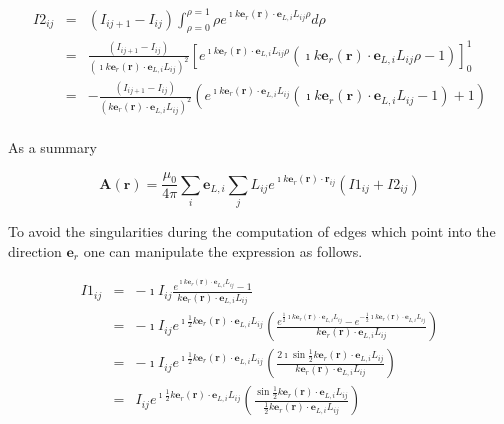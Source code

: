 \documentclass[a4paper,10pt]{report}
\begin{document}
\begin{eqnarray}\label{I2_solution}
    I2_{ij}&=&\left(I_{ij+1}-I_{ij}\right)\int_{\rho=0}^{\rho=1} \rho e^{\imath k \mathbf{e}_r(\mathbf{r}) \cdot\mathbf{e}_{L,i}L_{ij}\rho} d\rho \\
&=&\frac{\left(I_{ij+1}-I_{ij}\right)}{\left( \imath k \mathbf{e}_r(\mathbf{r}) \cdot\mathbf{e}_{L,i}L_{ij}\right)^2 } \left[ e^{\imath k \mathbf{e}_r(\mathbf{r}) \cdot\mathbf{e}_{L,i}L_{ij}\rho} \left(\imath k \mathbf{e}_r(\mathbf{r}) \cdot\mathbf{e}_{L,i}L_{ij}\rho -1 \right)\right]_0^1 \nonumber \\
&=&-\frac{\left(I_{ij+1}-I_{ij}\right)}{\left( k \mathbf{e}_r(\mathbf{r}) \cdot\mathbf{e}_{L,i}L_{ij}\right)^2 } \left( e^{\imath k \mathbf{e}_r(\mathbf{r}) \cdot\mathbf{e}_{L,i}L_{ij}} \left( \imath k \mathbf{e}_r(\mathbf{r}) \cdot\mathbf{e}_{L,i}L_{ij} -1 \right) +1 \right) \nonumber \\
\end{eqnarray}

As a summary

\begin{equation}
     \mathbf{A}(\mathbf{r})=\frac{\mu_0 }{4 \pi} \sum_i \mathbf{e}_{L,i} \sum_j L_{ij}e^{\imath k \mathbf{e}_r(\mathbf{r}) \cdot \mathbf{r}_{ij}}(I1_{ij}+I2_{ij})
\end{equation}

To avoid the singularities during the computation of edges which point into the direction $\mathbf{e}_r$ one can manipulate the expression as follows.

\begin{eqnarray}
    I1_{ij}&=&-\imath I_{ij}\frac{ e^{\imath k \mathbf{e}_r(\mathbf{r}) \cdot \mathbf{e}_{L,i}L_{ij}}-1}{ k \mathbf{e}_r(\mathbf{r}) \cdot\mathbf{e}_{L,i}L_{ij}}\\
&=&-\imath I_{ij}e^{\imath \frac{1}{2} k \mathbf{e}_r(\mathbf{r}) \cdot \mathbf{e}_{L,i}L_{ij}}\left( \frac{ e^{\frac{1}{2} \imath k \mathbf{e}_r(\mathbf{r}) \cdot \mathbf{e}_{L,i}L_{ij}}-e^{-\frac{1}{2} \imath k \mathbf{e}_r(\mathbf{r}) \cdot \mathbf{e}_{L,i}L_{ij}}}{ k \mathbf{e}_r(\mathbf{r}) \cdot\mathbf{e}_{L,i}L_{ij}} \right)\nonumber \\
&=&-\imath I_{ij}e^{\imath \frac{1}{2} k \mathbf{e}_r(\mathbf{r}) \cdot \mathbf{e}_{L,i}L_{ij}}\left( \frac{ 2 \imath \sin \frac{1}{2} k \mathbf{e}_r(\mathbf{r}) \cdot \mathbf{e}_{L,i}L_{ij}}{ k \mathbf{e}_r(\mathbf{r}) \cdot\mathbf{e}_{L,i}L_{ij}} \right)\nonumber \\
&=& I_{ij}e^{\imath \frac{1}{2} k \mathbf{e}_r(\mathbf{r}) \cdot \mathbf{e}_{L,i}L_{ij}}\left( \frac{  \sin \frac{1}{2}  k \mathbf{e}_r(\mathbf{r}) \cdot \mathbf{e}_{L,i}L_{ij}}{\frac{1}{2} k \mathbf{e}_r(\mathbf{r}) \cdot\mathbf{e}_{L,i}L_{ij}} \right)\nonumber
\end{eqnarray}
\end{document}
